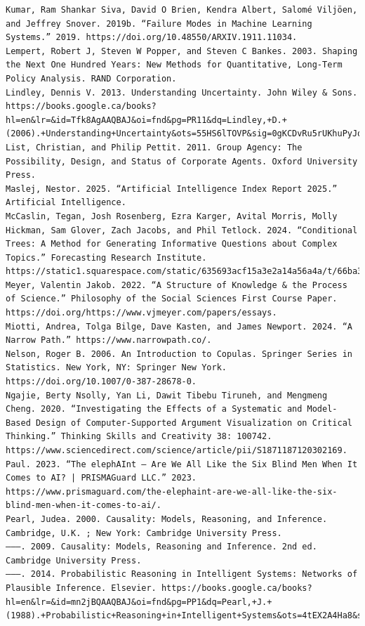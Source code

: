 \documentclass[
  11pt,
  letterpaper,
]{book}
\begin{document}
\begin{verbatim}
Kumar, Ram Shankar Siva, David O Brien, Kendra Albert, Salomé Viljöen, and Jeffrey Snover. 2019b. “Failure Modes in Machine Learning Systems.” 2019. https://doi.org/10.48550/ARXIV.1911.11034.
Lempert, Robert J, Steven W Popper, and Steven C Bankes. 2003. Shaping the Next One Hundred Years: New Methods for Quantitative, Long-Term Policy Analysis. RAND Corporation.
Lindley, Dennis V. 2013. Understanding Uncertainty. John Wiley & Sons. https://books.google.ca/books?hl=en&lr=&id=Tfk8AgAAQBAJ&oi=fnd&pg=PR11&dq=Lindley,+D.+(2006).+Understanding+Uncertainty&ots=55HS6lTOVP&sig=0gKCDvRu5rUKhuPyJqhOzW23upU.
List, Christian, and Philip Pettit. 2011. Group Agency: The Possibility, Design, and Status of Corporate Agents. Oxford University Press.
Maslej, Nestor. 2025. “Artificial Intelligence Index Report 2025.” Artificial Intelligence.
McCaslin, Tegan, Josh Rosenberg, Ezra Karger, Avital Morris, Molly Hickman, Sam Glover, Zach Jacobs, and Phil Tetlock. 2024. “Conditional Trees: A Method for Generating Informative Questions about Complex Topics.” Forecasting Research Institute. https://static1.squarespace.com/static/635693acf15a3e2a14a56a4a/t/66ba37a144f1d6095de467df/1723479995772/AIConditionalTrees.pdf.
Meyer, Valentin Jakob. 2022. “A Structure of Knowledge & the Process of Science.” Philosophy of the Social Sciences First Course Paper. https://doi.org/https://www.vjmeyer.com/papers/essays.
Miotti, Andrea, Tolga Bilge, Dave Kasten, and James Newport. 2024. “A Narrow Path.” https://www.narrowpath.co/.
Nelson, Roger B. 2006. An Introduction to Copulas. Springer Series in Statistics. New York, NY: Springer New York. https://doi.org/10.1007/0-387-28678-0.
Ngajie, Berty Nsolly, Yan Li, Dawit Tibebu Tiruneh, and Mengmeng Cheng. 2020. “Investigating the Effects of a Systematic and Model-Based Design of Computer-Supported Argument Visualization on Critical Thinking.” Thinking Skills and Creativity 38: 100742. https://www.sciencedirect.com/science/article/pii/S1871187120302169.
Paul. 2023. “The elephAInt – Are We All Like the Six Blind Men When It Comes to AI? | PRISMAGuard LLC.” 2023. https://www.prismaguard.com/the-elephaint-are-we-all-like-the-six-blind-men-when-it-comes-to-ai/.
Pearl, Judea. 2000. Causality: Models, Reasoning, and Inference. Cambridge, U.K. ; New York: Cambridge University Press.
———. 2009. Causality: Models, Reasoning and Inference. 2nd ed. Cambridge University Press.
———. 2014. Probabilistic Reasoning in Intelligent Systems: Networks of Plausible Inference. Elsevier. https://books.google.ca/books?hl=en&lr=&id=mn2jBQAAQBAJ&oi=fnd&pg=PP1&dq=Pearl,+J.+(1988).+Probabilistic+Reasoning+in+Intelligent+Systems&ots=4tEX2A4Ha8&sig=lgUs_RCoeXEEuGwM5xMEoyJy4HI.

\end{verbatim}
\end{document}
